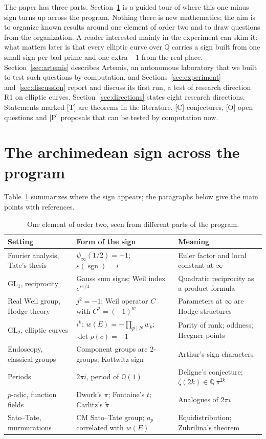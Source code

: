 \documentclass[11pt]{amsart}
\numberwithin{equation}{section}
\newcommand{\Q}{\mathbb{Q}}
\newcommand{\GL}{\mathrm{GL}}
\newcommand{\sgn}{\operatorname{sgn}}
\begin{document}
The paper has three parts. Section~\ref{sec:synthesis} is a guided tour of where this one minus sign turns up across the program. Nothing there is new mathematics; the aim is to organize known results around one element of order two and to draw questions from the organization. A reader interested mainly in the experiment can skim it: what matters later is that every elliptic curve over $\Q$ carries a sign built from one small sign per bad prime and one extra $-1$ from the real place. Section~\ref{sec:artemis} describes Artemis, an autonomous laboratory that we built to test such questions by computation, and Sections~\ref{sec:experiment} and~\ref{sec:discussion} report and discuss its first run, a test of research direction R1 on elliptic curves. Section~\ref{sec:directions} states eight research directions. Statements marked [T] are theorems in the literature, [C] conjectures, [O] open questions and [P] proposals that can be tested by computation now.

\section{The archimedean sign across the program}\label{sec:synthesis}

Table~\ref{tab:map} summarizes where the sign appears; the paragraphs below give the main points with references.

\begin{table}[ht]
\centering\small
\caption{One element of order two, seen from different parts of the program.}\label{tab:map}
\begin{tabular}{@{}>{\raggedright\arraybackslash}p{}>{\raggedright\arraybackslash}p{}>{\raggedright\arraybackslash}p{}@{}}
\toprule
Setting & Form of the sign & Meaning\\
\midrule
Fourier analysis, Tate's thesis & $\psi_\infty(1/2)=-1$; $\varepsilon(\sgn)=i$ & Euler factor and local constant at $\infty$\\
$\GL_1$, reciprocity & Gauss sum signs; Weil index $e^{i\pi/4}$ & Quadratic reciprocity as a product formula\\
Real Weil group, Hodge theory & $j^2=-1$; Weil operator $C$ with $C^2=(-1)^w$ & Parameters at $\infty$ are Hodge structures\\
$\GL_2$, elliptic curves & $i^k$; $w(E)=-\prod_{p\mid N}w_p$; $\det\rho(c)=-1$ & Parity of rank; oddness; Heegner points\\
Endoscopy, classical groups & Component groups are $2$-groups; Kottwitz sign & Arthur's sign characters\\
Periods & $2\pi i$, period of $\Q(1)$ & Deligne's conjecture; $\zeta(2k)\in\Q\,\pi^{2k}$\\
$p$-adic, function fields & Dwork's $\pi$; Fontaine's $t$; Carlitz's $\tilde\pi$ & Analogues of $2\pi i$\\
Sato--Tate, murmurations & CM Sato--Tate group; $a_p$ correlated with $w(E)$ & Equidistribution; Zubrilina's theorem\\
\bottomrule
\end{tabular}
\end{table}
\end{document}
